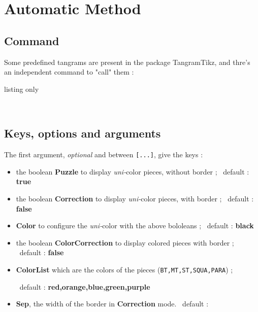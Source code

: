 \documentclass{article}
\newcommand\Cle[1]{{\bfseries\sffamily\textlangle #1\textrangle}}
\begin{document}
\pagebreak

\section{Automatic Method}

\subsection{Command}

Some predefined tangrams are present in the package \textsf{TangramTikz}, and thre's an independent \textsf{command} to "call" them :

\begin{PresentationCode}{listing only}
\end{PresentationCode}

\begin{PresentationCode}{}
~~~~
\end{PresentationCode}

\subsection{Keys, options and arguments}

The first argument, \textit{optional} and between \texttt{[...]}, give the keys :

\begin{itemize}
	\item the boolean \Cle{Puzzle} to display \textit{uni-}color pieces, without border ; \hfill~default : \Cle{true}
	\item the boolean \Cle{Correction} to display \textit{uni-}color pieces, with border ; \hfill~default : \Cle{false}
	\item \Cle{Color} to configure the \textit{uni-}color with the above bololeans ; \hfill~default : \Cle{black}
	\item the boolean \Cle{ColorCorrection} to display colored pieces with border ; \hfill~default : \Cle{false}
	\item \Cle{ColorList} which are the colors of the pieces (\texttt{BT,MT,ST,SQUA,PARA})  ;
	
	\hfill~default : \Cle{red,orange,blue,green,purple}
	\item \Cle{Sep}, the width of the border in \Cle{Correction} mode. \hfill~default : \Cle{1pt}
\end{itemize}
\end{document}
